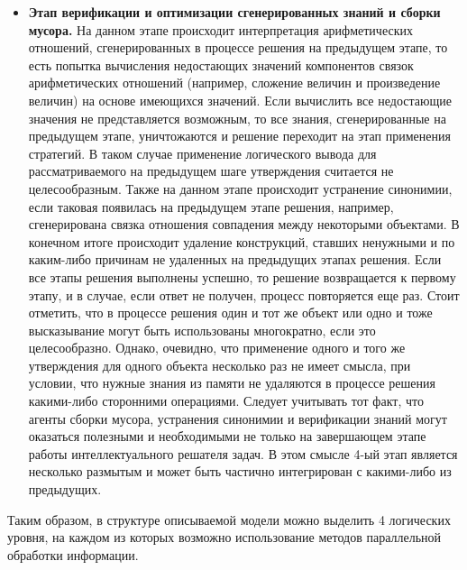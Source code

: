 \begin{itemize}
	\item{\textbf{Этап верификации и оптимизации сгенерированных знаний и сборки мусора.} На данном этапе происходит интерпретация арифметических отношений, сгенерированных в процессе решения на предыдущем этапе, то есть попытка вычисления недостающих значений компонентов связок арифметических отношений
	(например, сложение величин и произведение величин) на основе имеющихся значений. Если вычислить все недостающие значения не представляется возможным, то все знания, сгенерированные на предыдущем этапе,
	уничтожаются и решение переходит на этап применения стратегий. В таком случае применение логического вывода для рассматриваемого на предыдущем шаге утверждения считается не	целесообразным. Также на данном этапе происходит устранение синонимии, если таковая появилась на предыдущем этапе решения,
	например, сгенерирована связка отношения совпадения между некоторыми объектами. В конечном итоге происходит удаление конструкций, ставших ненужными и по каким-либо причинам не удаленных на предыдущих этапах решения. Если все этапы решения выполнены успешно, то решение возвращается к первому этапу, и в случае, если ответ не получен, процесс повторяется еще раз. Стоит отметить, что в процессе решения один и тот же объект или одно и тоже высказывание могут быть использованы многократно, если это целесообразно. Однако, очевидно, что применение одного и того же утверждения для одного объекта несколько раз не имеет смысла, при условии, что нужные знания из памяти не удаляются в процессе решения какими-либо сторонними операциями. Следует учитывать тот факт, что агенты сборки мусора, устранения синонимии и верификации знаний могут оказаться полезными и необходимыми не только на завершающем этапе работы интеллектуального решателя задач. В этом смысле 4-ый этап является несколько размытым и может быть частично интегрирован с какими-либо
	из предыдущих.}
\end{itemize}

Таким образом, в структуре описываемой модели можно выделить 4 логических уровня, на каждом из которых возможно использование методов параллельной обработки информации. 

